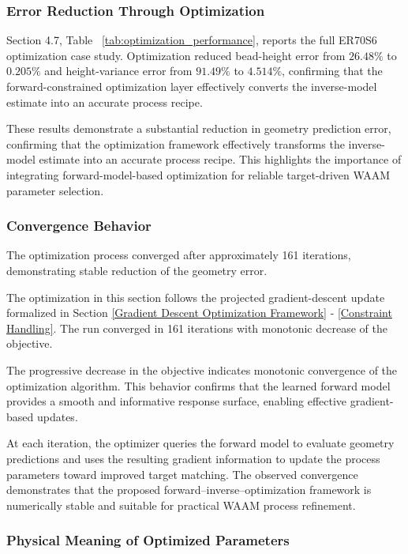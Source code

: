 \documentclass[11pt]{article}
\begin{document}
\subsubsection{Error Reduction Through Optimization}

Section 4.7, Table ~\ref{tab:optimization_performance}, reports the full ER70S\text{-}6 optimization case study. 
Optimization reduced bead-height error from $26.48\%$ to $0.205\%$ and height-variance 
error from $91.49\%$ to $4.514\%$, confirming that the forward-constrained optimization 
layer effectively converts the inverse-model estimate into an accurate process recipe.

These results demonstrate a substantial reduction in geometry prediction error, confirming that the optimization framework effectively transforms the inverse-model estimate into an accurate process recipe. This highlights the importance of integrating forward-model-based optimization for reliable target-driven WAAM parameter selection.

\subsubsection{Convergence Behavior}

The optimization process converged after approximately 161 iterations, demonstrating stable reduction of the geometry error.

The optimization in this section follows the projected gradient-descent
update formalized in Section \ref{Gradient Descent Optimization Framework} - \ref{Constraint Handling}. The run converged in 161 iterations with
monotonic decrease of the objective.

The progressive decrease in the objective indicates monotonic convergence of the optimization algorithm. This behavior confirms that the learned forward model provides a smooth and informative response surface, enabling effective gradient-based updates.

At each iteration, the optimizer queries the forward model to evaluate geometry predictions and uses the resulting gradient information to update the process parameters toward improved target matching. The observed convergence demonstrates that the proposed forward--inverse--optimization framework is numerically stable and suitable for practical WAAM process refinement.

\subsubsection{Physical Meaning of Optimized Parameters}
\end{document}
